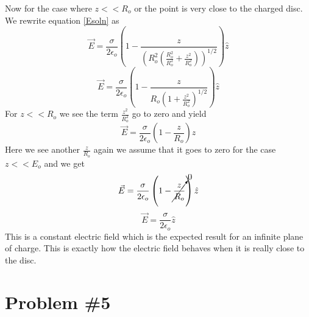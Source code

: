 \documentclass[11pt]{article}
\numberwithin{equation}{section}
\begin{document}
Now for the case where $z << R_o$ or the point is very close to the charged disc. We rewrite equation \ref{Esoln} as
$$\vec{E} = \frac{\sigma }{2\epsilon_o}\left(1 - \frac{z}{(R_o^2(\frac{R_o^2}{R_o^2} + \frac{z^2}{R_o^2}))^{1/2}} \right)\hat{z}$$
$$\vec{E} = \frac{\sigma }{2\epsilon_o}\left(1 - \frac{z}{R_o(1 + \frac{z^2}{R_o^2})^{1/2}} \right)\hat{z}$$
For $z << R_o$ we see the term $\frac{z^2}{R_o^2}$ go to zero and yield
$$\vec{E} = \frac{\sigma }{2\epsilon_o}\left(1 - \frac{z}{R_o} \right)\hat{z}$$
Here we see another $\frac{z}{R_o}$ again we assume that it goes to zero for the case $z << E_o$ and we get
$$\vec{E} = \frac{\sigma }{2\epsilon_o}\left(1 - \cancelto{0}{\frac{z}{R_o}} \right)\hat{z}$$
$$\vec{E} = \frac{\sigma }{2\epsilon_o}\hat{z}$$
This is a constant electric field which is the expected result for an infinite plane of charge. This is exactly how the electric field behaves when it is really close to the disc.

\section{Problem \#5}
\end{document}
